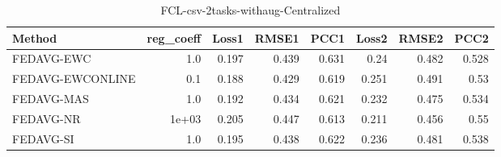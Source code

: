\begin{table}
\caption{FCL-csv-2tasks-withaug-Centralized}
\begin{tabular}{lrrrrrrr}
\toprule
Method & reg_coeff & Loss1 & RMSE1 & PCC1 & Loss2 & RMSE2 & PCC2 \\
\midrule
FEDAVG-EWC & 1.0 & 0.197 & 0.439 & 0.631 & 0.24 & 0.482 & 0.528 \\
FEDAVG-EWCONLINE & 0.1 & 0.188 & 0.429 & 0.619 & 0.251 & 0.491 & 0.53 \\
FEDAVG-MAS & 1.0 & 0.192 & 0.434 & 0.621 & 0.232 & 0.475 & 0.534 \\
FEDAVG-NR & 1e+03 & 0.205 & 0.447 & 0.613 & 0.211 & 0.456 & 0.55 \\
FEDAVG-SI & 1.0 & 0.195 & 0.438 & 0.622 & 0.236 & 0.481 & 0.538 \\
\bottomrule
\end{tabular}
\end{table}
